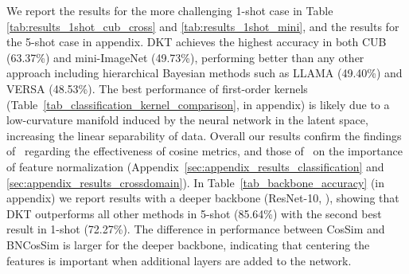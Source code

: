 \documentclass{article}
\begin{document}
We report the results for the more challenging 1-shot case in Table \ref{tab:results_1shot_cub_cross} and \ref{tab:results_1shot_mini}, and the results for the 5-shot case in appendix. DKT achieves the highest accuracy in both CUB (63.37\%) and mini-ImageNet (49.73\%), performing better than any other approach including hierarchical Bayesian methods such as LLAMA (49.40\%) and VERSA (48.53\%). The best performance of first-order kernels (Table~\ref{tab_classification_kernel_comparison}, in appendix) is likely due to a low-curvature manifold induced by the neural network in the latent space, increasing the linear separability of data. Overall our results confirm the findings of~\citet{chen2019closerfewshot} regarding the effectiveness of cosine metrics, and those of~\citet{wang2019simpleshot} on the importance of feature normalization (Appendix~\ref{sec:appendix_results_classification} and \ref{sec:appendix_results_crossdomain}). In Table~\ref{tab_backbone_accuracy} (in appendix) we report results with a deeper backbone (ResNet-10, \citealt{he2016deep}), showing that DKT outperforms all other methods in 5-shot (85.64\%) with the second best result in 1-shot (72.27\%). The difference in performance between CosSim and BNCosSim is larger for the deeper backbone, indicating that centering the features is important when additional layers are added to the network.
\end{document}

